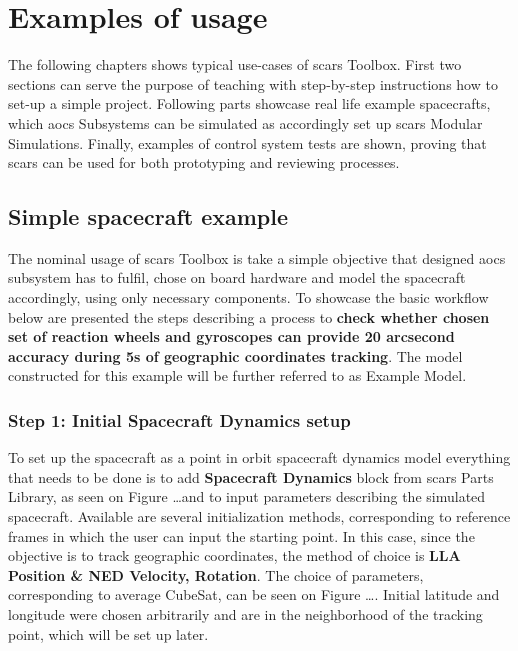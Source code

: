 \section{Examples of usage}\label{sec:examples}
    The following chapters shows typical use-cases of \ac{scars} Toolbox. First two sections can serve the purpose of teaching with step-by-step instructions how to set-up a simple project. Following parts showcase real life example spacecrafts, which \ac{aocs} Subsystems can be simulated as accordingly set up \ac{scars} Modular Simulations. Finally, examples of control system tests are shown, proving that \ac{scars} can be used for both prototyping and reviewing processes.


    \subsection{Simple spacecraft example}
        The nominal usage of \ac{scars} Toolbox is take a simple objective that designed \ac{aocs} subsystem has to fulfil, chose on board hardware and model the spacecraft accordingly, using only necessary components. To showcase the basic workflow below are presented the steps describing a process to \textbf{check whether chosen set of reaction wheels and gyroscopes can provide 20 arcsecond accuracy during 5s of geographic coordinates tracking}. The model constructed for this example will be further referred to as Example Model. 

        \subsubsection*{Step 1: Initial Spacecraft Dynamics setup}
            To set up the spacecraft as a point in orbit spacecraft dynamics model everything that needs to be done is to add \textbf{Spacecraft Dynamics} block from \ac{scars} Parts Library, as seen on Figure \dots and to input parameters describing the simulated spacecraft. Available are several initialization methods, corresponding to reference frames in which the user can input the starting point. In this case, since the objective is to track geographic coordinates, the method of choice is \textbf{LLA Position \& NED Velocity, Rotation}. The choice of parameters, corresponding to average CubeSat, can be seen on Figure \dots. Initial latitude and longitude were chosen arbitrarily and are in the neighborhood of the tracking point, which will be set up later.

